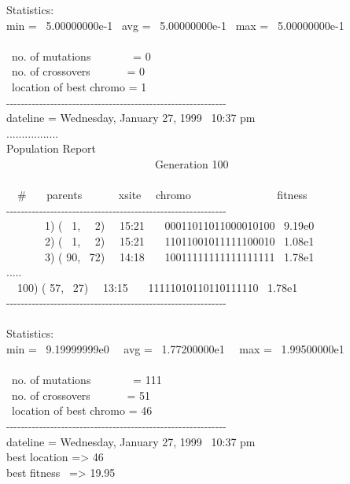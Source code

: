 {Statistics:  \\
min = \ 5.00000000e-1 \ avg = \ 5.00000000e-1 \ max = \ 5.00000000e-1  \\
\ \\
\ no. of mutations \ \ \ \ \ \ \ = 0 \\
\ no. of crossovers \ \ \ \ \ \ = 0 \\
\ location of best chromo = 1 \\
{}-{}-{}-{}-{}-{}-{}-{}-{}-{}-{}-{}-{}-{}-{}-{}-{}-{}-{}-{}-{}-{}-{}-{}-{}-{}-{}-{}-{}-{}-{}-{}-{}-{}-{}-{}-{}-{}-{}-{}-{}-{}-{}-{}-{}-{}-{}-{}-{}-{}-{}-{}-{}-{}-{}-{}-{}-{}-{}-{}- \\
dateline = Wednesday, January 27, 1999 \ 10:37 pm \\
................. \\
Population Report \\
\>   \ \ \ \ \ \ \ \ \ \ \ \ \ \ \ \ \ \ \ \ \ \ \ \ \ \ \ Generation
100 \\
\ \\
\>   \ \ \# \ \ \ parents \ \ \ \ \ \ xsite \ \ chromo
\ \ \ \ \ \ \ \ \ \ \ \ \ \ \ fitness  \\
{}-{}-{}-{}-{}-{}-{}-{}-{}-{}-{}-{}-{}-{}-{}-{}-{}-{}-{}-{}-{}-{}-{}-{}-{}-{}-{}-{}-{}-{}-{}-{}-{}-{}-{}-{}-{}-{}-{}-{}-{}-{}-{}-{}-{}-{}-{}-{}-{}-{}-{}-{}-{}-{}-{}-{}-{}-{}-{}-{}- \\
\ \ \ \ \ \ \ 1) ( \ 1, \ \ 2) \ \ 15:21 \ \ \ 00011011011000010100
\ 9.19e0 \  \\
\ \ \ \ \ \ \ 2) ( \ 1, \ \ 2) \ \ 15:21 \ \ \ 11011001011111100010
\ 1.08e1 \  \\
\ \ \ \ \ \ \ 3) ( 90, \ 72) \ \ 14:18 \ \ \ 10011111111111111111
\ 1.78e1 \ \  \\
..... \\
\>   \ \ 100) ( 57, \ 27) \ \ 13:15 \ \ \ 11111010110110111110 \ 1.78e1
\  \\
{}-{}-{}-{}-{}-{}-{}-{}-{}-{}-{}-{}-{}-{}-{}-{}-{}-{}-{}-{}-{}-{}-{}-{}-{}-{}-{}-{}-{}-{}-{}-{}-{}-{}-{}-{}-{}-{}-{}-{}-{}-{}-{}-{}-{}-{}-{}-{}-{}-{}-{}-{}-{}-{}-{}-{}-{}-{}-{}-{}- \\
\ \\
Statistics:  \\
min = \ 9.19999999e0 \ \ avg = \ 1.77200000e1 \ \ max = \ 1.99500000e1
\  \\
\ \\
\ no. of mutations \ \ \ \ \ \ \ = 111 \\
\ no. of crossovers \ \ \ \ \ \ = 51 \\
\ location of best chromo = 46 \\
{}-{}-{}-{}-{}-{}-{}-{}-{}-{}-{}-{}-{}-{}-{}-{}-{}-{}-{}-{}-{}-{}-{}-{}-{}-{}-{}-{}-{}-{}-{}-{}-{}-{}-{}-{}-{}-{}-{}-{}-{}-{}-{}-{}-{}-{}-{}-{}-{}-{}-{}-{}-{}-{}-{}-{}-{}-{}-{}-{}- \\
dateline = Wednesday, January 27, 1999 \ 10:37 pm \\
best location ={\textgreater} 46 \\
best fitness \ ={\textgreater} 19.95
}

